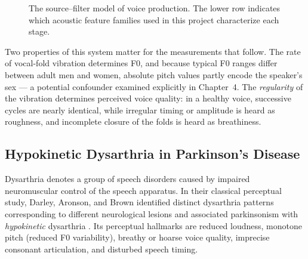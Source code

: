 \begin{figure}[htb]
\centering
{}
\caption{The source--filter model of voice production. The lower row
indicates which acoustic feature families used in this project
characterize each stage.}
\label{fig:sourcefilter}
\end{figure}

Two properties of this system matter for the measurements that follow.
The rate of vocal-fold vibration determines F0, and because typical F0
ranges differ between adult men and women, absolute pitch values partly
encode the speaker's sex --- a potential confounder examined explicitly
in Chapter~4. The \emph{regularity} of the vibration determines
perceived voice quality: in a healthy voice, successive cycles are
nearly identical, while irregular timing or amplitude is heard as
roughness, and incomplete closure of the folds is heard as breathiness.

\subsection{Hypokinetic Dysarthria in Parkinson's Disease}

Dysarthria denotes a group of speech disorders caused by impaired
neuromuscular control of the speech apparatus. In their classical
perceptual study, Darley, Aronson, and Brown identified distinct
dysarthria patterns corresponding to different neurological lesions and
associated parkinsonism with \emph{hypokinetic} dysarthria
\cite{darley1969}. Its perceptual hallmarks are reduced loudness,
monotone pitch (reduced F0 variability), breathy or hoarse voice
quality, imprecise consonant articulation, and disturbed speech timing.

